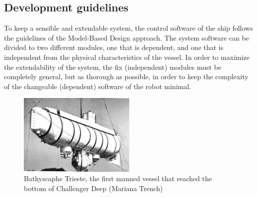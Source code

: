\subsection*{Development guidelines}
To keep a sensible and extendable system, the control software of the ship follows the guidelines of the Model-Based Design approach. The system software can be divided to two different modules, one that is dependent, and one that is independent from the physical characteristics of the vessel. In order to maximize the extendability of the system, the fix (independent) modules must be completely general, but as thorough as possible, in order to keep the complexity of the changeable (dependent) software of the robot minimal.
\begin{figure}
  \begin{center}
    \includegraphics[width=0.5\textwidth]{img/trieste}
  \end{center}
  \caption{Bathyscaphe Trieste, the first manned vessel that reached the bottom of Challenger Deep (Mariana Trench)\cite{trieste}}
\end{figure}
